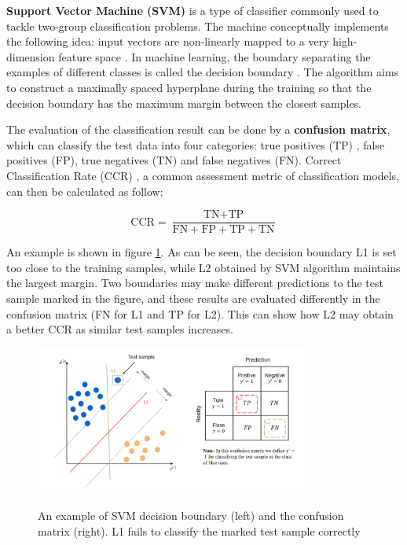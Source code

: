 \textbf{Support Vector Machine (SVM)} is a type of classifier commonly used to tackle two-group classification problems. The machine conceptually implements the following idea: input vectors are non-linearly mapped to a very high-dimension feature space \cite{cortes1995support}. In machine learning, the boundary separating the examples of different classes is called the decision boundary \cite{burkov2019hundred}. The algorithm aims to construct a maximally spaced hyperplane during the training so that the decision boundary has the maximum margin between the closest samples. 

The evaluation of the classification result can be done by a \textbf{confusion matrix}, which can classify the test data into four categories: true positives (TP) , false positives (FP), true negatives (TN) and false negatives (FN). Correct Classification Rate (CCR) , a common assessment metric of classification models, can then be calculated as follow:

$$
   \text{CCR} = \frac{\text{TN} + \text{TP}}{\text{FN} + \text{FP} + \text{TP} + \text{TN}}
$$

An example is shown in figure \ref{fig:4}. As can be seen, the decision boundary L1 is set too close to the training samples, while L2 obtained by SVM algorithm maintains the largest margin. Two boundaries may make different predictions to the test sample marked in the figure, and these results are evaluated differently in the confusion matrix (FN for L1 and TP for L2). This can show how L2 may obtain a better CCR as similar test samples increases.

\begin{figure}[h]
  \centering
  \includegraphics[width=0.8\textwidth]{Figures/SVM and confusion matrix.png}
  \caption{An example of SVM decision boundary (left) and the confusion matrix (right). L1 fails to classify the marked test sample correctly}
\cite{burkov2019hundred}
  \label{fig:4}
\end{figure}

